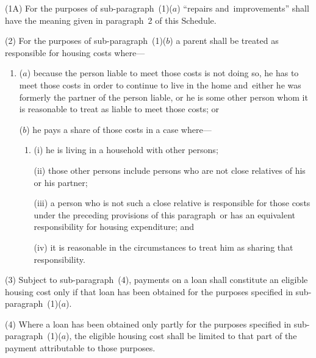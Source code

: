 \documentclass[12pt,a4paper]{article}
\begin{document}
(1A) For the purposes of sub-paragraph~(1)($a$) “repairs and~improvements” shall have the meaning given in paragraph~2 of this Schedule.

(2) For the purposes of sub-paragraph~(1)($b$) a parent shall be treated as responsible for housing costs where—
\begin{enumerate}\item[]
($a$) because the person liable to meet those costs is not doing so, he has to meet those costs in order to continue to live in the home and~either he was formerly the partner of the person liable, or he is some other person whom it is reasonable to treat as liable to meet those costs; or

($b$) he pays a share of those costs in a case where—
\begin{enumerate}\item[]
(i) he is living in a household with other persons;

(ii) those other persons include persons who are not close relatives of his or his partner;

(iii) a person who is not such a close relative is responsible for those costs under the preceding provisions of this paragraph~or has an equivalent responsibility for housing expenditure; and

(iv) it is reasonable in the circumstances to treat him as sharing that responsibility.
\end{enumerate}
\end{enumerate}

(3) Subject to sub-paragraph~(4), payments on a loan shall constitute an eligible housing cost only if that loan has been obtained for the purposes specified in sub-paragraph~(1)($a$).

(4) Where a loan has been obtained only partly for the purposes specified in sub-paragraph~(1)($a$), the eligible housing cost shall be limited to that part of the payment attributable to those purposes.

\end{document}

